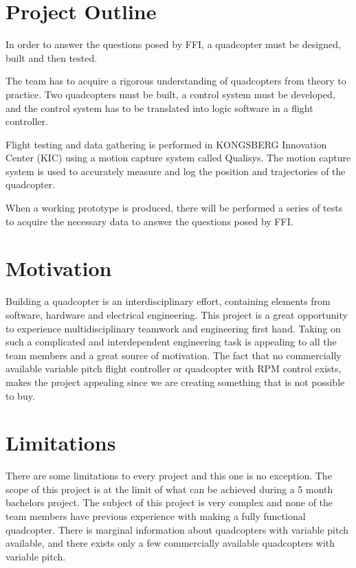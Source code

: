 \section*{Project Outline} 
In order to answer the questions posed by FFI, a quadcopter must be designed, built and then tested. \bigskip

The team has to acquire a rigorous understanding of quadcopters from theory to practice. Two quadcopters must be built, a control system must be developed, and the control system has to be translated into logic software in a flight controller.\bigskip

Flight testing and data gathering is performed in KONGSBERG Innovation Center (KIC) using a motion capture system called Qualisys. The motion capture system is used to accurately measure and log the position and trajectories of the quadcopter. \bigskip

When a working prototype is produced, there will be performed a series of tests to acquire the necessary data to answer the questions posed by FFI.

\clearpage 

\section*{Motivation}
Building a quadcopter is an interdisciplinary effort, containing elements from software, hardware and electrical engineering. This project is a great opportunity to experience multidisciplinary teamwork and engineering first hand. Taking on such a complicated and interdependent engineering task is appealing to all the team members and a great source of motivation. The fact that no commercially available variable pitch flight controller or quadcopter with RPM control exists, makes the project appealing since we are creating something that is not possible to buy.\bigskip

\section*{Limitations}
There are some limitations to every project and this one is no exception. The scope of this project is at the limit of what can be achieved during a 5 month bachelors project. The subject of this project is very complex and none of the team members have previous experience with making a fully functional quadcopter. There is marginal information about quadcopters with variable pitch available, and there exists only a few commercially available quadcopters with variable pitch. \bigskip

